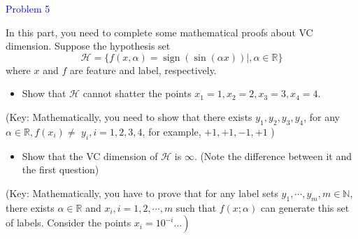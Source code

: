 \textcolor{blue}{Problem 5}

In this part, you need to complete some mathematical proofs about VC dimension. Suppose the hypothesis set
$$
\mathcal{H}=\{f(x, \alpha)=\operatorname{sign}(\sin (\alpha x)) \mid, \alpha \in \mathbb{R}\}
$$
where $x$ and $f$ are feature and label, respectively.
\begin{itemize}
    \item Show that $\mathcal{H}$ cannot shatter the points $x_1=1, x_2=2, x_3=3, x_4=4$.
\end{itemize}
(Key: Mathematically, you need to show that there exists $y_1, y_2, y_3, y_4$, for any $\alpha \in \mathbb{R}, f\left(x_i\right) \neq$ $y_i, i=1,2,3,4$, for example, $+1,+1,-1,+1$ )
\begin{itemize}
\item Show that the VC dimension of $\mathcal{H}$ is $\infty$. (Note the difference between it and the first question)
\end{itemize}
(Key: Mathematically, you have to prove that for any label sets $y_1, \cdots, y_m, m \in \mathbb{N}$, there exists $\alpha \in \mathbb{R}$ and $x_i, i=1,2, \cdots, m$ such that $f(x ; \alpha)$ can generate this set of labels. Consider the points $\left.x_i=10^{-i} \ldots\right)$

